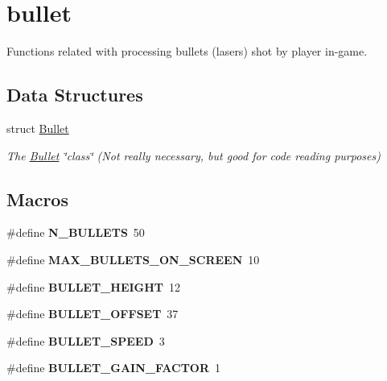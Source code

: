 \hypertarget{group__bullet}{}\section{bullet}
\label{group__bullet}


Functions related with processing bullets (lasers) shot by player in-\/game.  


\subsection*{Data Structures}
\begin{DoxyCompactItemize}
\item 
struct \hyperlink{struct_bullet}{Bullet}
\begin{DoxyCompactList}\small\item\em The \hyperlink{struct_bullet}{Bullet} \char`\"{}class\char`\"{} (Not really necessary, but good for code reading purposes) \end{DoxyCompactList}\end{DoxyCompactItemize}
\subsection*{Macros}
\begin{DoxyCompactItemize}
\item 
\hypertarget{group__bullet_gaaa5bfb702f940c6bae0cf67564d121fb}{}\label{group__bullet_gaaa5bfb702f940c6bae0cf67564d121fb} 
\#define {\bfseries N\+\_\+\+B\+U\+L\+L\+E\+TS}~50
\item 
\hypertarget{group__bullet_ga98bca580357a061356b549e2754bcf9d}{}\label{group__bullet_ga98bca580357a061356b549e2754bcf9d} 
\#define {\bfseries M\+A\+X\+\_\+\+B\+U\+L\+L\+E\+T\+S\+\_\+\+O\+N\+\_\+\+S\+C\+R\+E\+EN}~10
\item 
\hypertarget{group__bullet_gac91cd0386a836b604804b5dd09c0a65c}{}\label{group__bullet_gac91cd0386a836b604804b5dd09c0a65c} 
\#define {\bfseries B\+U\+L\+L\+E\+T\+\_\+\+H\+E\+I\+G\+HT}~12
\item 
\hypertarget{group__bullet_gaa88983cdaf4f3c6d69aee4c57066c989}{}\label{group__bullet_gaa88983cdaf4f3c6d69aee4c57066c989} 
\#define {\bfseries B\+U\+L\+L\+E\+T\+\_\+\+O\+F\+F\+S\+ET}~37
\item 
\hypertarget{group__bullet_ga70b3e643b533b8f785b7912e69434161}{}\label{group__bullet_ga70b3e643b533b8f785b7912e69434161} 
\#define {\bfseries B\+U\+L\+L\+E\+T\+\_\+\+S\+P\+E\+ED}~3
\item 
\hypertarget{group__bullet_gab2621d8750a2ab7c4dfd98fe49ea4d1b}{}\label{group__bullet_gab2621d8750a2ab7c4dfd98fe49ea4d1b} 
\#define {\bfseries B\+U\+L\+L\+E\+T\+\_\+\+G\+A\+I\+N\+\_\+\+F\+A\+C\+T\+OR}~1
\end{DoxyCompactItemize}
